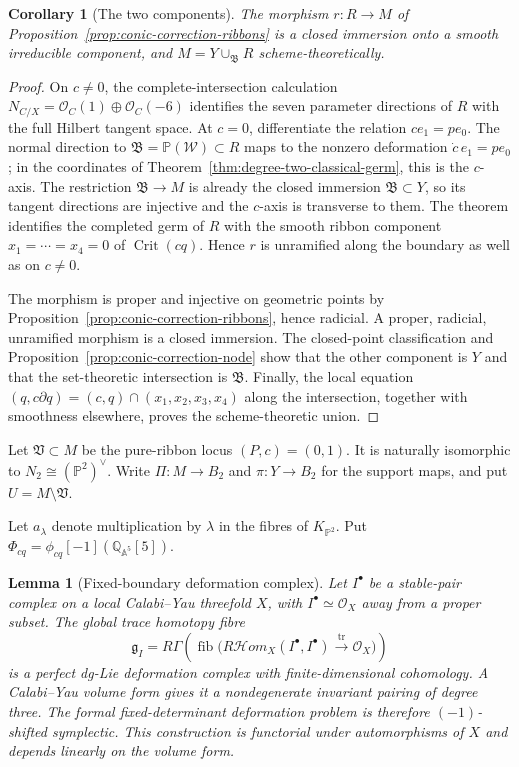\documentclass[11pt,reqno]{amsart}
\newtheorem{lemma}[theorem]{Lemma}
\newtheorem{corollary}[theorem]{Corollary}
\theoremstyle{definition}
\newcommand{\Q}{\mathbb Q}
\newcommand{\Pp}{\mathbb P}
\newcommand{\Ocal}{\mathcal O}
\begin{document}
\begin{corollary}[The two components]\label{cor:degree-two-union}
The morphism $r:R\to M$ of
Proposition~\ref{prop:conic-correction-ribbons} is a closed immersion onto a
smooth irreducible component, and $M=Y\cup_{\mathfrak B}R$
scheme-theoretically.
\end{corollary}

\begin{proof}
On $c\ne0$, the complete-intersection calculation
$N_{C/X}=\Ocal_C(1)\oplus\Ocal_C(-6)$ identifies the seven parameter
directions of $R$ with the full Hilbert tangent space.  At $c=0$,
differentiate the relation $ce_1=pe_0$.  The normal direction to
$\mathfrak B=\Pp(\mathcal W)\subset R$ maps to the nonzero deformation
$\dot c\,e_1=pe_0$; in the coordinates of
Theorem~\ref{thm:degree-two-classical-germ}, this is the $c$-axis.  The
restriction $\mathfrak B\to M$ is already the closed immersion
$\mathfrak B\subset Y$, so its tangent directions are injective and the
$c$-axis is transverse to them.  The theorem identifies the completed germ
of $R$ with the smooth ribbon component $x_1=\cdots=x_4=0$ of
$\operatorname{Crit}(cq)$.  Hence $r$ is unramified along the boundary as
well as on $c\ne0$.

The morphism is proper and injective on geometric points by
Proposition~\ref{prop:conic-correction-ribbons}, hence radicial.  A proper,
radicial, unramified morphism is a closed immersion.  The closed-point
classification and Proposition~\ref{prop:conic-correction-node} show that
the other component is $Y$ and that the set-theoretic intersection is
$\mathfrak B$.  Finally, the local equation
$(q,c\partial q)=(c,q)\cap(x_1,x_2,x_3,x_4)$ along the intersection, together
with smoothness elsewhere, proves the scheme-theoretic union.
\end{proof}

Let $\mathfrak V\subset M$ be the pure-ribbon locus $(P,c)=(0,1)$.
It is naturally isomorphic to $N_2\cong(\Pp^2)^\vee$.  Write
$\Pi:M\to B_2$ and $\pi:Y\to B_2$ for the support maps, and put
$U=M\setminus\mathfrak V$.

Let $a_\lambda$ denote multiplication by $\lambda$ in the fibres of
$K_{\Pp^2}$.  Put
$\Phi_{cq}=\phi_{cq}[-1](\Q_{\mathbb A^5}[5])$.

\begin{lemma}[Fixed-boundary deformation complex]
\label{lem:fixed-boundary-form}
Let $I^\bullet$ be a stable-pair complex on a local Calabi--Yau threefold
$X$, with $I^\bullet\simeq\Ocal_X$ away from a proper subset.  The global
trace homotopy fibre
\[
 \mathfrak g_I=R\Gamma\!\left(
 \operatorname{fib}\bigl(
 R\mathcal Hom_X(I^\bullet,I^\bullet)
 \xrightarrow{\operatorname{tr}}\Ocal_X\bigr)\right)
\]
is a perfect dg-Lie deformation complex with finite-dimensional cohomology.
A Calabi--Yau volume form gives it a nondegenerate invariant pairing of
degree three.  The formal fixed-determinant deformation problem is therefore
$(-1)$-shifted symplectic.  This construction is functorial under
automorphisms of $X$ and depends linearly on the volume form.
\end{lemma}
\end{document}
